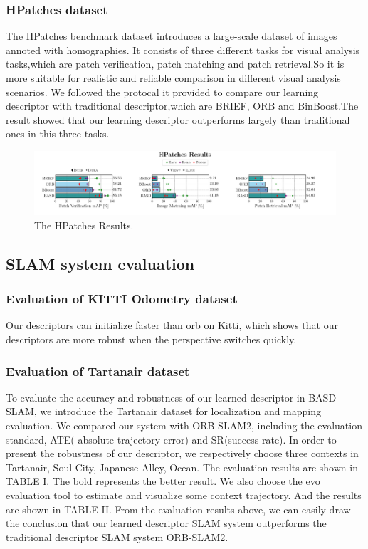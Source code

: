 \documentclass{svproc}
\begin{document}
\subsubsection{HPatches dataset}
The HPatches benchmark dataset introduces a large-scale dataset of images annoted with homographies. It consists of three different tasks for visual analysis tasks,which are patch verification, patch matching and patch retrieval.So it is more suitable for realistic and reliable comparison in different visual analysis scenarios. We followed the protocal it provided to compare our learning descriptor with traditional descriptor,which are BRIEF, ORB and BinBoost.The result showed that our learning descriptor outperforms largely than traditional ones in this three tasks.

\begin{figure}[h]
\centering
\includegraphics[scale=0.33]{HPatches--orb_brief_binboost_BASD}
\caption{The HPatches Results.} \scriptsize
\end{figure}


\subsection{SLAM system evaluation}

\subsubsection{Evaluation of KITTI Odometry dataset}
Our descriptors can initialize faster than orb on Kitti, which shows that our descriptors are more robust when the perspective switches quickly.

\subsubsection{Evaluation of Tartanair dataset}
To evaluate the accuracy and robustness of our learned descriptor in BASD-SLAM, we introduce the Tartanair dataset for localization and mapping evaluation. We compared our system with ORB-SLAM2, including the evaluation standard, ATE( absolute trajectory error) and SR(success rate). In order to present the robustness of our descriptor, we respectively choose three contexts in Tartanair, Soul-City, Japanese-Alley, Ocean. The evaluation results are shown in TABLE I. The bold represents the better result. We also choose the evo evaluation tool to estimate and visualize some context trajectory. And the results are shown in TABLE II. From the evaluation results above, we can easily draw the conclusion that our learned descriptor SLAM system outperforms the traditional descriptor SLAM system ORB-SLAM2.
\end{document}
